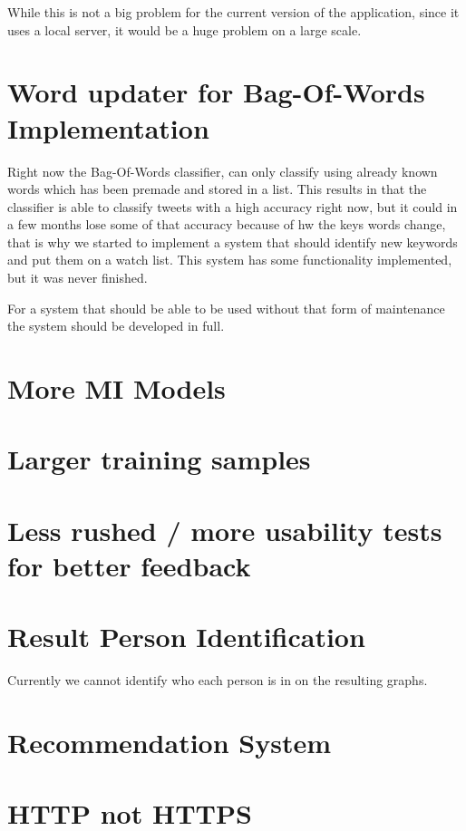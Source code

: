 While this is not a big problem for the current version of the application,
since it uses a local server, it would be a huge problem on a large scale. 

\section{Word updater for Bag-Of-Words Implementation}
Right now the Bag-Of-Words classifier, can only classify using already known
words which has been premade and stored in a list. This results in that the
classifier is able to classify tweets with a high accuracy right now, but it
could in a few months lose some of that accuracy because of hw the keys words 
change, that is why we started to implement a system that should identify new
keywords and put them on  a watch list. This system has some functionality
implemented, but it was never finished.

For a system that should be able to be used without that form of maintenance the
system should be developed in full.

\section{More MI  Models}

\section{Larger training samples}

\section{Less rushed / more usability tests for better feedback}

\section{Result Person Identification}
Currently we cannot identify who each person is in on the resulting graphs.

\section{Recommendation System}

\section{HTTP not HTTPS}
